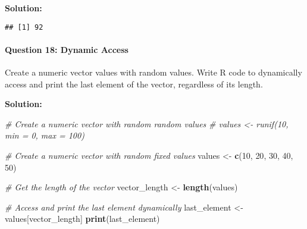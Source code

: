 \documentclass[
]{article}
\newenvironment{Shaded}{\begin{snugshade}}{\end{snugshade}}
\newcommand{\AttributeTok}[1]{\textcolor[rgb]{0.13,0.29,0.53}{#1}}
\newcommand{\CommentTok}[1]{\textcolor[rgb]{0.56,0.35,0.01}{\textit{#1}}}
\newcommand{\ConstantTok}[1]{\textcolor[rgb]{0.56,0.35,0.01}{#1}}
\newcommand{\DecValTok}[1]{\textcolor[rgb]{0.00,0.00,0.81}{#1}}
\newcommand{\FunctionTok}[1]{\textcolor[rgb]{0.13,0.29,0.53}{\textbf{#1}}}
\newcommand{\NormalTok}[1]{#1}
\newcommand{\OtherTok}[1]{\textcolor[rgb]{0.56,0.35,0.01}{#1}}
\newcommand{\SpecialCharTok}[1]{\textcolor[rgb]{0.81,0.36,0.00}{\textbf{#1}}}
\newcommand{\StringTok}[1]{\textcolor[rgb]{0.31,0.60,0.02}{#1}}
\begin{document}
\textbf{Solution:}

\begin{Shaded}
\end{Shaded}

\begin{verbatim}
## [1] 92
\end{verbatim}

\hypertarget{question-18-dynamic-access}{%
\paragraph{Question 18: Dynamic
Access}\label{question-18-dynamic-access}}

Create a numeric vector values with random values. Write R code to
dynamically access and print the last element of the vector, regardless
of its length.

\textbf{Solution:}

\begin{Shaded}
\begin{Highlighting}[]
\CommentTok{\# Create a numeric vector with random random values}
\CommentTok{\# values \textless{}{-} runif(10, min = 0, max = 100)}

\CommentTok{\# Create a numeric vector with random fixed values}
\NormalTok{values }\OtherTok{\textless{}{-}} \FunctionTok{c}\NormalTok{(}\DecValTok{10}\NormalTok{, }\DecValTok{20}\NormalTok{, }\DecValTok{30}\NormalTok{, }\DecValTok{40}\NormalTok{, }\DecValTok{50}\NormalTok{)}

\CommentTok{\# Get the length of the vector}
\NormalTok{vector\_length }\OtherTok{\textless{}{-}} \FunctionTok{length}\NormalTok{(values)}

\CommentTok{\# Access and print the last element dynamically}
\NormalTok{last\_element }\OtherTok{\textless{}{-}}\NormalTok{ values[vector\_length]}
\FunctionTok{print}\NormalTok{(last\_element)}
\end{Highlighting}
\end{Shaded}
\end{document}

